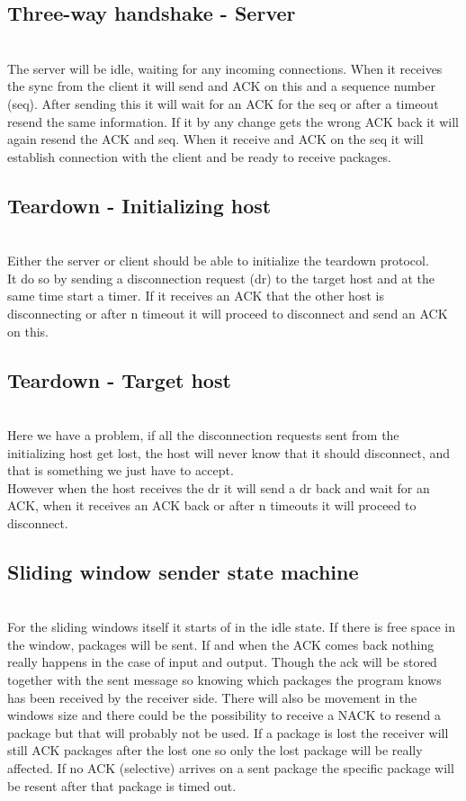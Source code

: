 \documentclass[conference]{IEEEtran}
\begin{document}
\subsection{Three-way handshake - Server}

\\
The server will be idle, waiting for any incoming connections. When it receives the sync from the client it will send and ACK on this and a sequence number (seq). After sending this it will wait for an ACK for the seq or after a timeout resend the same information. If it by any change gets the wrong ACK back it will again resend the ACK and seq. When it receive and ACK on the seq it will establish connection with the client and be ready to receive packages.
\subsection{Teardown - Initializing host}

\\
Either the server or client should be able to initialize the teardown protocol.
\\
It do so by sending a disconnection request (dr) to the target host and at the same time start a timer. If it receives an ACK that the other host is disconnecting or after n timeout it will proceed to disconnect and send an ACK on this. 
\subsection{Teardown - Target host}

\\
Here we have a problem, if all the disconnection requests sent from the initializing host get lost, the host will never know that it should disconnect, and that is something we just have to accept.
\\
However when the host receives the dr it will send a dr back and wait for an ACK, when it receives an ACK back or after n timeouts it will proceed to disconnect.
\subsection{Sliding window sender state machine}

\\For the sliding windows itself it starts of in the idle state. If there is free space in the window, packages will be sent. If and when the ACK comes back nothing really happens in the case of input and output. Though the ack will be stored together with the sent message so knowing which packages the program knows has been received by the receiver side. There will also be movement in the windows size and there could be the possibility to receive a NACK to resend a package but that will probably not be used. If a package is lost the receiver will still ACK packages after the lost one so only the lost package will be really affected. If no ACK (selective) arrives on a sent package the specific package will be resent after that package is timed out.
\end{document}
